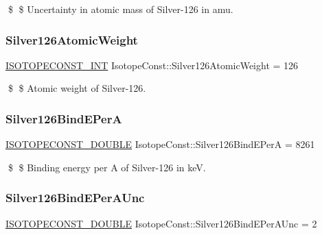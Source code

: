 \$ \$ Uncertainty in atomic mass of Silver-\/126 in amu. \mbox{\label{group___isotope_const-_silver-_ag126_gaf2a9b399feea5bf132cbfa2cbbf2caf3}} 
\subsubsection{\texorpdfstring{Silver126\+Atomic\+Weight}{Silver126AtomicWeight}}
{\footnotesize\ttfamily \mbox{\hyperlink{group___isotope_const-_macros_ga5f18360b3e99483a35c32d789e62621c}{I\+S\+O\+T\+O\+P\+E\+C\+O\+N\+S\+T\+\_\+\+I\+NT}} Isotope\+Const\+::\+Silver126\+Atomic\+Weight = 126}

\$ \$ Atomic weight of Silver-\/126. \mbox{\label{group___isotope_const-_silver-_ag126_ga40c90cae02a9ab7bb0dbcedce317a818}} 
\subsubsection{\texorpdfstring{Silver126\+Bind\+E\+PerA}{Silver126BindEPerA}}
{\footnotesize\ttfamily \mbox{\hyperlink{group___isotope_const-_macros_ga8f45a7272ce02c0b4c65c44636ed719a}{I\+S\+O\+T\+O\+P\+E\+C\+O\+N\+S\+T\+\_\+\+D\+O\+U\+B\+LE}} Isotope\+Const\+::\+Silver126\+Bind\+E\+PerA = 8261}

\$ \$ Binding energy per A of Silver-\/126 in keV. \mbox{\label{group___isotope_const-_silver-_ag126_ga49aac119019ee394abac26fd953797ec}} 
\subsubsection{\texorpdfstring{Silver126\+Bind\+E\+Per\+A\+Unc}{Silver126BindEPerAUnc}}
{\footnotesize\ttfamily \mbox{\hyperlink{group___isotope_const-_macros_ga8f45a7272ce02c0b4c65c44636ed719a}{I\+S\+O\+T\+O\+P\+E\+C\+O\+N\+S\+T\+\_\+\+D\+O\+U\+B\+LE}} Isotope\+Const\+::\+Silver126\+Bind\+E\+Per\+A\+Unc = 2}

